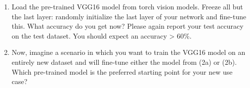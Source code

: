 \documentclass[a4paper]{article}
\begin{document}
\begin{enumerate}
\begin{enumerate}
			\item Load the pre-trained VGG16 model from torch vision models. Freeze all but the last layer: randomly initialize the last layer of your network and fine-tune this. What accuracy do you get now? Please again report your test accuracy on the test dataset. You should expect an accuracy > 60\%.
			
			\item Now, imagine a scenario in which you want to train the VGG16 model on an entirely new dataset and will fine-tune either the model from (2a) or (2b). Which pre-trained model is the preferred starting point for your new use case?
			
		\end{enumerate} 
	\end{enumerate}
\end{document}
